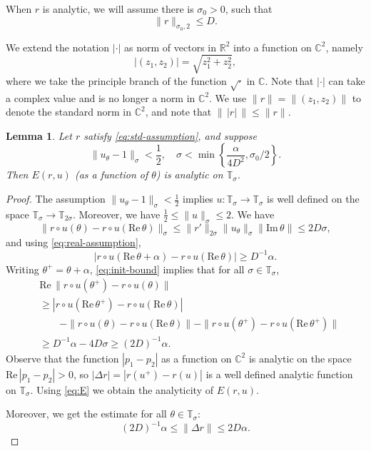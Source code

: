 \documentclass[12pt,reqno]{amsart}
\newtheorem{lem}[thm]{Lemma}
\theoremstyle{remark}
\begin{document}
When $r$ is analytic, we will assume
there is $\sigma_0 >0$, such that
\begin{equation}
	\label{eq:std-assumption}
	\|r\|_{\sigma_0, 2} \le D. \tag{A2}
\end{equation}

We extend the notation $|\cdot|$ as norm of vectors in ${\mathbb{R}}^2$ into a function on ${\mathbb{C}}^2$, namely
\[
	|(z_1, z_2)| = \sqrt{z_1^2 + z_2^2}, 
\]
where we take the principle branch of the function $\sqrt{\cdot}$ in ${\mathbb{C}}$. Note that $|\cdot|$ can take a complex value and is no longer a norm in ${\mathbb{C}}^2$. We use $\|r\| = \|(z_1, z_2)\|$ to denote the standard norm in ${\mathbb{C}}^2$, and note that $\bigl\|\,  |r| \, \bigr\| \le \|r\|$. 

\begin{lem}\label{lem:func-def}
Let $r$ satisfy \eqref{eq:std-assumption}, and suppose 
\begin{equation}
	\label{eq:init-bound}
	\|u_\theta - 1\|_\sigma < \frac12, \quad
	\sigma < \min\left\{   \frac{\alpha}{4D^2}, \sigma_0/2  \right\}. 
\end{equation}
Then $E(r, u)$ (as a function of $\theta$) is analytic on ${\mathbb{T}}_\sigma$.
\end{lem}
\begin{proof}
	The assumption	$\|u_\theta - 1\|_\sigma < \frac12$ implies $u: {\mathbb{T}}_\sigma \to {\mathbb{T}}_\sigma$ is well defined on the space ${\mathbb{T}}_\sigma \to {\mathbb{T}}_{2\sigma}$. Moreover, we have $\frac12 \le \|u\|_\sigma \le 2$. 
	We have 
	\[
		\|r \circ u (\theta) - r \circ u ({\mathrm{Re}\,} \theta)\|_\sigma \le \|r'\|_{2\sigma} \|u_\theta\|_\sigma \|{\mathrm{Im}\,} \theta\| \le 2D \sigma, 
	\]
	and using \eqref{eq:real-assumption}, 
	\[
		|r\circ u ({\mathrm{Re}\,} \theta + \alpha) - r\circ u({\mathrm{Re}\,} \theta)| \ge D^{-1}\alpha. 
	\]
	Writing $\theta^+ = \theta + \alpha$,  \eqref{eq:init-bound} implies that for all $\sigma \in{\mathbb{T}}_\sigma$, 
	\[
		\begin{aligned}
		   & {\mathrm{Re}\,}\|r\circ u(\theta^+) - r\circ u(\theta)\|  \\ 
		   &\ge	 |r \circ u ({\mathrm{Re}\,} \theta^+) - r \circ u({\mathrm{Re}\,} \theta)| \\
		 & \quad\quad		   - \|r \circ u (\theta) - r \circ u ({\mathrm{Re}\,} \theta)\| - 
		 \|r \circ u (\theta^+) - r \circ u ({\mathrm{Re}\,} \theta^+)\| \\
		 & \ge D^{-1} \alpha - 4D \sigma \ge (2D)^{-1} \alpha. 
		\end{aligned}
	\]
	Observe that the function $|p_1 - p_2|$ as a function on ${\mathbb{C}}^2$ is analytic on the space ${\mathrm{Re}\,} |p_1 - p_2| > 0$, so $|\Delta r| = |r(u^+) - r(u)|$ is a well defined analytic function on ${\mathbb{T}}_\sigma$. Using \eqref{eq:E} we obtain the analyticity of $E(r, u)$. 

	Moreover, we get the estimate for all $\theta \in {\mathbb{T}}_\sigma$:
	\begin{equation}
	  \label{eq:delta-r}
	  (2D)^{-1} \alpha \le \| \Delta r\|   \le 2D \alpha. 
	\end{equation}
\end{proof}
\end{document}

